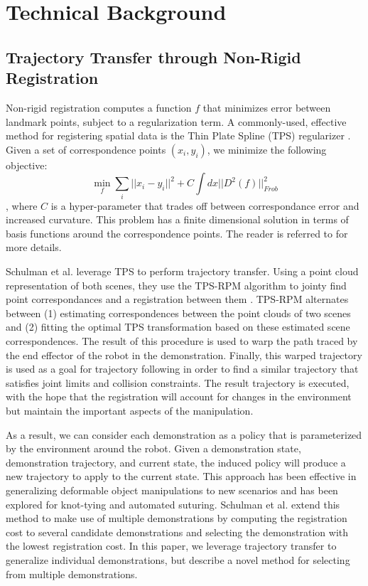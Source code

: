 \section{Technical Background}

\subsection{Trajectory Transfer through Non-Rigid Registration}
Non-rigid registration computes a function $f$ that minimizes error between landmark points, subject to a regularization term.
A commonly-used, effective method for registering spatial data is the Thin Plate Spline (TPS) regularizer .
Given a set of correspondence points $(x_i, y_i)$, we minimize the following objective:
$$\min_f \sum_i ||x_i - y_i||^2 + C\int dx ||D^2(f)||^2_{Frob}$$,
where $C$ is a hyper-parameter that trades off between correspondance error and increased curvature.
This problem has a finite dimensional solution in terms of basis functions around the correspondence points.
The reader is referred to  for more details.

Schulman et al. leverage TPS to perform trajectory transfer. 
Using a point cloud representation of both scenes, they use the TPS-RPM algorithm to jointy find point correspondances and a registration between them .
TPS-RPM alternates between (1) estimating correspondences between the point clouds of two scenes and (2) fitting the optimal TPS transformation based on these estimated scene correspondences. 
The result of this procedure is used to warp the path traced by the end effector of the robot in the demonstration.
Finally, this warped trajectory is used as a goal for trajectory following in order to find a similar trajectory that satisfies joint limits and collision constraints.
The result trajectory is executed, with the hope that the registration will account for changes in the environment but maintain the important aspects of the manipulation.

As a result, we can consider each demonstration as a policy that is parameterized by the environment around the robot.
Given a demonstration state, demonstration trajectory, and current state, the induced policy will produce a new trajectory to apply to the current state.
This approach has been effective in generalizing deformable object manipulations to new scenarios and has been explored for knot-tying and automated suturing.
Schulman et al. extend this method to make use of multiple demonstrations by computing the registration cost to several candidate demonstrations and selecting the demonstration with the lowest registration cost.
In this paper, we leverage trajectory transfer to generalize individual demonstrations, but describe a novel method for selecting from multiple demonstrations.

